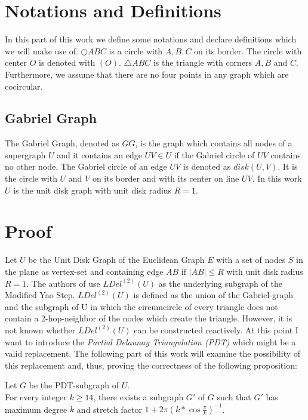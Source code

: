 \section{Notations and Definitions}
In this part of this work we define some notations and declare definitions which we will make use of.
$\bigcirc{ABC} $ is a circle with $A, B, C $ on its border.
The circle with center $O $ is denoted with $(O) $.
$\triangle{ABC} $ is the triangle with corners $A,B $ and $C $.
Furthermore, we assume that there are no four points in any graph which are cocircular.

\subsection{Gabriel Graph}
The Gabriel Graph, denoted as $GG $, is the graph which contains all nodes of a supergraph $U $ and it contains an edge $UV \in U $ if the Gabriel circle of $UV $ contains no other node.
The Gabriel circle of an edge $UV $ is denoted as $disk(U, V) $.
It is the circle with $U $ and $V $ on its border and with its center on line $UV $. 
In this work $U $ is the unit disk graph with unit disk radius $R = 1 $.



\section{Proof}
Let $U $ be the Unit Disk Graph of the Euclidean Graph $E $ with a set of nodes $S $ in the plane as vertex-set and containing edge $AB $ if $|AB| \leq R $ with unit disk radius $R=1 $.
The authors of \cite{kanj} use $LDel^{(2)}(U) $ as the underlying subgraph of the Modified Yao Step.
$LDel^{(2)}(U) $ is defined as the union of the Gabriel-graph and the subgraph of U in which the circumcircle of every triangle does not contain a 2-hop-neighbor of the nodes which create the triangle.
However, it is not known whether $LDel^{(2)}(U) $ can be constructed reactively.
At this point I want to introduce the \emph{Partial Delaunay Triangulation (PDT)} \cite{pdt} which might be a valid replacement.
The following part of this work will examine the possibility of this replacement and, thus, proving the correctness of the following proposition:

\begin{prop}
\label{mastertheorem}
Let $G $ be the PDT-subgraph of $U $.\\
For every integer $k \geq 14 $, there exists a subgraph $G' $ of $G $ such that $G' $ has maximum degree $k $ and stretch factor $1+2\pi (k*\cos{\frac{\pi}{k}})^{-1} $.
\end{prop} 


